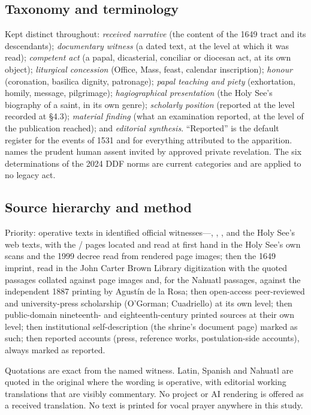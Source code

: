 \subsection*{Taxonomy and terminology}

Kept distinct throughout: \emph{received narrative} (the content of
the 1649 tract and its descendants); \emph{documentary witness} (a
dated text, at the level at which it was read); \emph{competent act}
(a papal, dicasterial, conciliar or diocesan act, at its own object);
\emph{liturgical concession} (Office, Mass, feast, calendar
inscription); \emph{honour} (coronation, basilica dignity, patronage);
\emph{papal teaching and piety} (exhortation, homily, message,
pilgrimage); \emph{hagiographical presentation} (the Holy See's
biography of a saint, in its own genre); \emph{scholarly position}
(reported at the level recorded at \S4.3); \emph{material finding}
(what an examination reported, at the level of the publication
reached); and \emph{editorial synthesis}. ``Reported'' is the default
register for the events of 1531 and for everything attributed to the
apparition.  names the prudent human assent invited
by approved private revelation. The six determinations of the 2024 DDF
norms are current categories and are applied to no legacy act.

\subsection*{Source hierarchy and method}

Priority: operative texts in identified official witnesses---, , , and
the Holy See's web texts, with the / pages located
and read at first hand in the Holy See's own scans and the 1999
 decree read from rendered page images; then the 1649
imprint, read in the John Carter Brown Library digitization with the
quoted passages collated against page images and, for the Nahuatl
passages, against the independent 1887 printing by Agust\'in de la
Rosa; then open-access peer-reviewed and university-press scholarship
(O'Gorman; Cuadriello) at its own level; then public-domain
nineteenth- and eighteenth-century printed sources at their own level;
then institutional self-description (the shrine's document page) marked
as such; then reported accounts (press, reference works,
postulation-side accounts), always marked as reported.

Quotations are exact from the named witness. Latin, Spanish and
Nahuatl are quoted in the original where the wording is operative,
with editorial working translations that are visibly commentary. No
project or AI rendering is offered as a received translation. No text
is printed for vocal prayer anywhere in this study.

